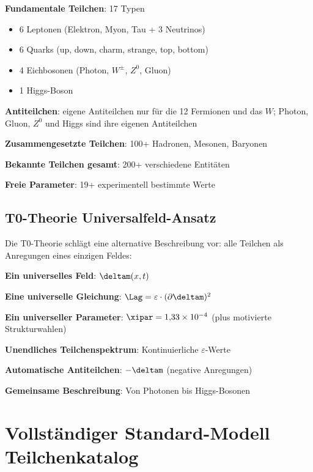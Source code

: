 	\begin{tcolorbox}[colback=red!5!white,colframe=red!75!black,title=Standard-Modell: Teilchen und Parameter]
		\textbf{Fundamentale Teilchen}: 17 Typen
		\begin{itemize}
			\item 6 Leptonen (Elektron, Myon, Tau + 3 Neutrinos)
			\item 6 Quarks (up, down, charm, strange, top, bottom)
			\item 4 Eichbosonen (Photon, $W^{\pm}$, $Z^0$, Gluon)
			\item 1 Higgs-Boson
		\end{itemize}
		
		\textbf{Antiteilchen}: eigene Antiteilchen nur für die 12 Fermionen und das $W$; Photon, Gluon, $Z^0$ und Higgs sind ihre eigenen Antiteilchen
		
		\textbf{Zusammengesetzte Teilchen}: 100+ Hadronen, Mesonen, Baryonen
		
		\textbf{Bekannte Teilchen gesamt}: 200+ verschiedene Entitäten
		
		\textbf{Freie Parameter}: 19+ experimentell bestimmte Werte
	\end{tcolorbox}
	
	\subsection{T0-Theorie Universalfeld-Ansatz}
	
	Die T0-Theorie schlägt eine alternative Beschreibung vor: alle Teilchen als Anregungen eines einzigen Feldes:
	
	\begin{tcolorbox}[colback=blue!5!white,colframe=blue!75!black,title=T0 Universalfeld-Vereinfachung]
		\textbf{Ein universelles Feld}: $\deltam(x,t)$
		
		\textbf{Eine universelle Gleichung}: $\Lag = \varepsilon \cdot (\partial \deltam)^2$
		
		\textbf{Ein universeller Parameter}: $\xipar = 1{,}33 \times 10^{-4}$ (plus motivierte Strukturwahlen)
		
		\textbf{Unendliches Teilchenspektrum}: Kontinuierliche $\varepsilon$-Werte
		
		\textbf{Automatische Antiteilchen}: $-\deltam$ (negative Anregungen)
		
		\textbf{Gemeinsame Beschreibung}: Von Photonen bis Higgs-Bosonen
	\end{tcolorbox}
	
	\section{Vollständiger Standard-Modell Teilchenkatalog}
	

